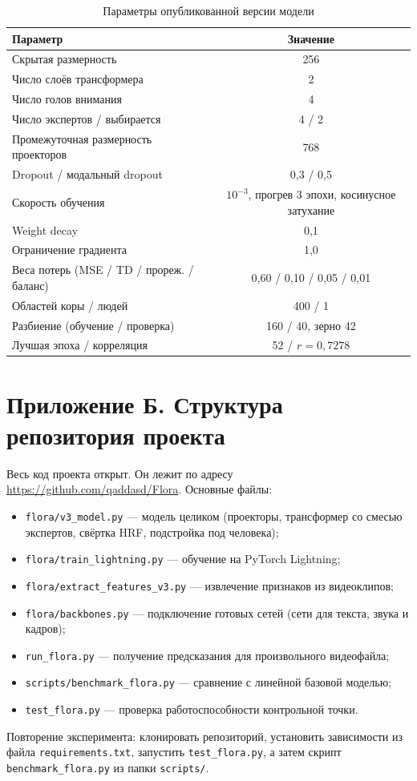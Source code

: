 \documentclass[12pt,a4paper]{article}
\begin{document}
\begin{table}[H]
\centering
\caption{Параметры опубликованной версии модели}
\label{tab:apphyper}
\small
\begin{tabular}{lc}
\toprule
Параметр & Значение \\
\midrule
Скрытая размерность            & 256 \\
Число слоёв трансформера       & 2 \\
Число голов внимания           & 4 \\
Число экспертов / выбирается   & 4 / 2 \\
Промежуточная размерность проекторов & 768 \\
Dropout / модальный dropout    & 0{,}3 / 0{,}5 \\
Скорость обучения              & $10^{-3}$, прогрев 3 эпохи, косинусное затухание \\
Weight decay                    & 0{,}1 \\
Ограничение градиента          & 1{,}0 \\
Веса потерь (MSE / TD / прореж. / баланс) & 0{,}60 / 0{,}10 / 0{,}05 / 0{,}01 \\
Областей коры / людей          & 400 / 1 \\
Разбиение (обучение / проверка) & 160 / 40, зерно 42 \\
Лучшая эпоха / корреляция      & 52 / $r = 0{,}7278$ \\
\bottomrule
\end{tabular}
\end{table}

\section*{Приложение Б. Структура репозитория проекта}

Весь код проекта открыт. Он лежит по адресу
\url{https://github.com/qaddasd/Flora}. Основные файлы:

\begin{itemize}
    \item \texttt{flora/v3\_model.py} — модель целиком (проекторы,
          трансформер со смесью экспертов, свёртка HRF, подстройка под человека);
    \item \texttt{flora/train\_lightning.py} — обучение на PyTorch
          Lightning;
    \item \texttt{flora/extract\_features\_v3.py} — извлечение
          признаков из видеоклипов;
    \item \texttt{flora/backbones.py} — подключение готовых сетей
          (сети для текста, звука и кадров);
    \item \texttt{run\_flora.py} — получение предсказания для
          произвольного видеофайла;
    \item \texttt{scripts/benchmark\_flora.py} — сравнение с линейной
          базовой моделью;
    \item \texttt{test\_flora.py} — проверка работоспособности
          контрольной точки.
\end{itemize}

Повторение эксперимента: клонировать репозиторий, установить
зависимости из файла \texttt{requirements.txt}, запустить
\texttt{test\_flora.py}, а затем скрипт \texttt{benchmark\_flora.py}
из папки \texttt{scripts/}.
\end{document}
